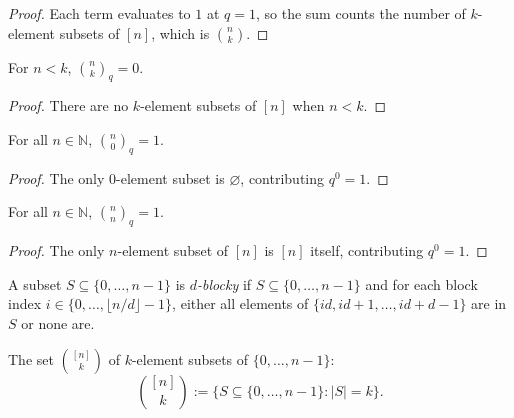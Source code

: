 \begin{proof}
\leanok
Each term evaluates to $1$ at $q = 1$, so the sum counts the number of
$k$-element subsets of $[n]$, which is $\binom{n}{k}$.
\end{proof}

\begin{lemma}
\label{lem.qBinomial_eq_zero_of_lt}
\leanhelper
\leanok
For $n < k$, $\binom{n}{k}_q = 0$.
\end{lemma}

\begin{proof}
\leanok
There are no $k$-element subsets of $[n]$ when $n < k$.
\end{proof}

\begin{lemma}
\label{lem.qBinomial_zero_right}
\leanhelper
\leanok
For all $n \in \mathbb{N}$, $\binom{n}{0}_q = 1$.
\end{lemma}

\begin{proof}
\leanok
The only $0$-element subset is $\varnothing$, contributing
$q^0 = 1$.
\end{proof}

\begin{lemma}
\label{lem.qBinomial_self}
\leanhelper
\leanok
For all $n \in \mathbb{N}$, $\binom{n}{n}_q = 1$.
\end{lemma}

\begin{proof}
\leanok
The only $n$-element subset of $[n]$ is $[n]$ itself, contributing
$q^0 = 1$.
\end{proof}

\begin{definition}
\label{def.IsDBlocky}
\leanhelper
\leanok
A subset $S \subseteq \{0, \ldots, n-1\}$ is \emph{$d$-blocky} if
$S \subseteq \{0, \ldots, n-1\}$ and for each block index
$i \in \{0, \ldots, \lfloor n/d \rfloor - 1\}$, either all elements of
$\{id, id+1, \ldots, id+d-1\}$ are in $S$ or none are.
\end{definition}

\begin{definition}
\label{def.kSubsets}
\leanhelper
\leanok
The set $\binom{[n]}{k}$ of $k$-element subsets of
$\{0, \ldots, n-1\}$:
\[
\binom{[n]}{k} := \bigl\{S \subseteq \{0,\ldots,n-1\} : |S| = k\bigr\}.
\]
\end{definition}

